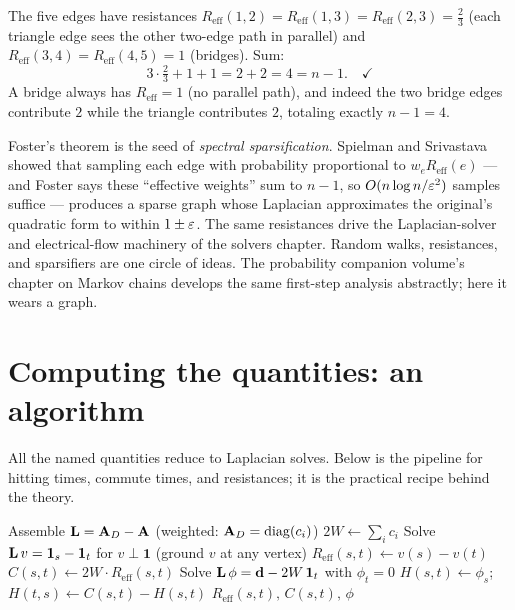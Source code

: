 \begin{example}\label{ch35:ex-foster}
The five edges have resistances $R_{\mathrm{eff}}(1,2)=R_{\mathrm{eff}}(1,3)=R_{\mathrm{eff}}(2,3)=\tfrac23$ (each triangle edge sees the other two-edge path in parallel) and $R_{\mathrm{eff}}(3,4)=R_{\mathrm{eff}}(4,5)=1$ (bridges). Sum:
\[
  3\cdot\tfrac23+1+1=2+2=4=n-1.\quad\checkmark
\]
A bridge always has $R_{\mathrm{eff}}=1$ (no parallel path), and indeed the two bridge edges contribute $2$ while the triangle contributes $2$, totaling exactly $n-1=4$.
\end{example}

\begin{connectionbox}
Foster's theorem is the seed of \emph{spectral sparsification}. Spielman and Srivastava showed that sampling each edge with probability proportional to $w_e R_{\mathrm{eff}}(e)$ --- and Foster says these ``effective weights'' sum to $n-1$, so $O(n\log n/\varepsilon^2)$ samples suffice --- produces a sparse graph whose Laplacian approximates the original's quadratic form to within $1\pm\varepsilon$. The same resistances drive the Laplacian-solver and electrical-flow machinery of the solvers chapter. Random walks, resistances, and sparsifiers are one circle of ideas. The probability companion volume's chapter on Markov chains develops the same first-step analysis abstractly; here it wears a graph.
\end{connectionbox}

\section{Computing the quantities: an algorithm}

All the named quantities reduce to Laplacian solves. Below is the pipeline for hitting times, commute times, and resistances; it is the practical recipe behind the theory.

\begin{algorithm}[H]
\DontPrintSemicolon
\caption{Random-walk quantities via Laplacian solves}
Assemble $\mathbf{L}=\mathbf{A}_D-\mathbf{A}$ (weighted: $\mathbf{A}_D=\mathrm{diag}(c_i)$)\;
$2W \leftarrow \sum_i c_i$ 
Solve $\mathbf{L}\,v=\mathbf{1}_s-\mathbf{1}_t$ for $v\perp\mathbf{1}$ (ground $v$ at any vertex)\;
$R_{\mathrm{eff}}(s,t)\leftarrow v(s)-v(t)$\;
$C(s,t)\leftarrow 2W\cdot R_{\mathrm{eff}}(s,t)$\;
Solve $\mathbf{L}\,\phi=\mathbf{d}-2W\,\mathbf{1}_t$ with $\phi_t=0$ 
$H(s,t)\leftarrow \phi_s$;\quad $H(t,s)\leftarrow C(s,t)-H(s,t)$\;
\Return $R_{\mathrm{eff}}(s,t),\,C(s,t),\,\phi$\;
\end{algorithm}

